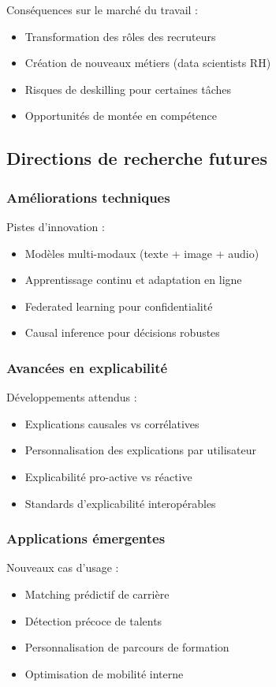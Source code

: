\documentclass[12pt,a4paper]{report}
\begin{document}
Conséquences sur le marché du travail :
\begin{itemize}
\item Transformation des rôles des recruteurs
\item Création de nouveaux métiers (data scientists RH)
\item Risques de deskilling pour certaines tâches
\item Opportunités de montée en compétence
\end{itemize}

\subsection{Directions de recherche futures}

\subsubsection{Améliorations techniques}

Pistes d'innovation :
\begin{itemize}
\item Modèles multi-modaux (texte + image + audio)
\item Apprentissage continu et adaptation en ligne
\item Federated learning pour confidentialité
\item Causal inference pour décisions robustes
\end{itemize}

\subsubsection{Avancées en explicabilité}

Développements attendus :
\begin{itemize}
\item Explications causales vs corrélatives
\item Personnalisation des explications par utilisateur
\item Explicabilité pro-active vs réactive
\item Standards d'explicabilité interopérables
\end{itemize}

\subsubsection{Applications émergentes}

Nouveaux cas d'usage :
\begin{itemize}
\item Matching prédictif de carrière
\item Détection précoce de talents
\item Personnalisation de parcours de formation
\item Optimisation de mobilité interne
\end{itemize}
\end{document}
